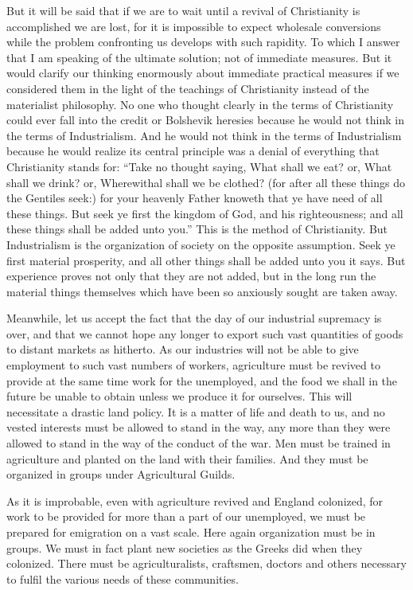 \documentclass{book}
\begin{document}
But it will be said that if we are to wait until a revival of Christianity is accomplished we are lost, for it is impossible to expect wholesale conversions while the problem confronting us develops with such rapidity. To which I answer that I am speaking of the ultimate solution; not of immediate measures. But it would clarify our thinking enormously about immediate practical measures if we considered them in the light of the teachings of Christianity instead of the materialist philosophy. No one who thought clearly in the terms of Christianity could ever fall into the credit or Bolshevik heresies because he would not think in the terms of Industrialism. And he would not think in the terms of Industrialism because he would realize its central principle was a denial of everything that Christianity stands for: “Take no thought saying, What shall we eat? or, What shall we drink? or, Wherewithal shall we be clothed? (for after all these things do the Gentiles seek:) for your heavenly Father knoweth that ye have need of all these things. But seek ye first the kingdom of God, and his righteousness; and all these things shall be added unto you.” This is the method of Christianity. But Industrialism is the organization of society on the opposite assumption. Seek ye first material prosperity, and all other things shall be added unto you it says. But experience proves not only that they are not added, but in the long run the material things themselves which have been so anxiously sought are taken away.

Meanwhile, let us accept the fact that the day of our industrial supremacy is over, and that we cannot hope any longer to export such vast quantities of goods to distant markets as hitherto. As our industries will not be able to give employment to such vast numbers of workers, agriculture must be revived to provide at the same time work for the unemployed, and the food we shall in the future be unable to obtain unless we produce it for ourselves. This will necessitate a drastic land policy. It is a matter of life and death to us, and no vested interests must be allowed to stand in the way, any more than they were allowed to stand in the way of the conduct of the war. Men must be trained in agriculture and planted on the land with their families. And they must be organized in groups under Agricultural Guilds.

As it is improbable, even with agriculture revived and England colonized, for work to be provided for more than a part of our unemployed, we must be prepared for emigration on a vast scale. Here again organization must be in groups. We must in fact plant new societies as the Greeks did when they colonized. There must be agriculturalists, craftsmen, doctors and others necessary to fulfil the various needs of these communities.
\end{document}
